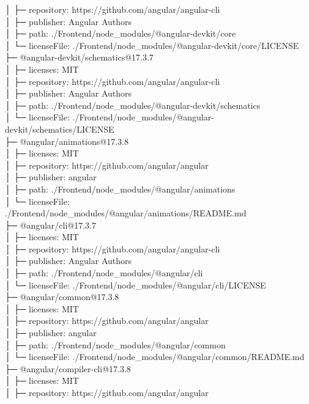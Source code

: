 │  ├─ repository: https://github.com/angular/angular-cli\\
│  ├─ publisher: Angular Authors\\
│  ├─ path: ./Frontend/node\_modules/@angular-devkit/core\\
│  └─ licenseFile: ./Frontend/node\_modules/@angular-devkit/core/LICENSE\\
├─ @angular-devkit/schematics@17.3.7\\
│  ├─ licenses: MIT\\
│  ├─ repository: https://github.com/angular/angular-cli\\
│  ├─ publisher: Angular Authors\\
│  ├─ path: ./Frontend/node\_modules/@angular-devkit/schematics\\
│  └─ licenseFile: ./Frontend/node\_modules/@angular-devkit/schematics/LICENSE\\
├─ @angular/animations@17.3.8\\
│  ├─ licenses: MIT\\
│  ├─ repository: https://github.com/angular/angular\\
│  ├─ publisher: angular\\
│  ├─ path: ./Frontend/node\_modules/@angular/animations\\
│  └─ licenseFile: ./Frontend/node\_modules/@angular/animations/README.md\\
├─ @angular/cli@17.3.7\\
│  ├─ licenses: MIT\\
│  ├─ repository: https://github.com/angular/angular-cli\\
│  ├─ publisher: Angular Authors\\
│  ├─ path: ./Frontend/node\_modules/@angular/cli\\
│  └─ licenseFile: ./Frontend/node\_modules/@angular/cli/LICENSE\\
├─ @angular/common@17.3.8\\
│  ├─ licenses: MIT\\
│  ├─ repository: https://github.com/angular/angular\\
│  ├─ publisher: angular\\
│  ├─ path: ./Frontend/node\_modules/@angular/common\\
│  └─ licenseFile: ./Frontend/node\_modules/@angular/common/README.md\\
├─ @angular/compiler-cli@17.3.8\\
│  ├─ licenses: MIT\\
│  ├─ repository: https://github.com/angular/angular\\
